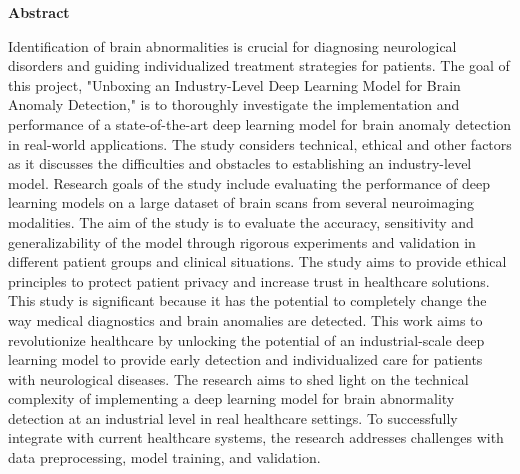 \begin{center}
    \huge \textbf{Abstract}
\end{center}
\vspace{15mm}
    Identification of brain abnormalities is crucial for diagnosing neurological disorders and guiding individualized treatment strategies for patients. The goal of this project, "Unboxing an Industry-Level Deep Learning Model for Brain Anomaly Detection," is to thoroughly investigate the implementation and performance of a state-of-the-art deep learning model for brain anomaly detection in real-world applications. The study considers technical, ethical and other factors as it discusses the difficulties and obstacles to establishing an industry-level model. Research goals of the study include evaluating the performance of deep learning models on a large dataset of brain scans from several neuroimaging modalities. The aim of the study is to evaluate the accuracy, sensitivity and generalizability of the model through rigorous experiments and validation in different patient groups and clinical situations. The study aims to provide ethical principles to protect patient privacy and increase trust in healthcare solutions. This study is significant because it has the potential to completely change the way medical diagnostics and brain anomalies are detected. This work aims to revolutionize healthcare by unlocking the potential of an industrial-scale deep learning model to provide early detection and individualized care for patients with neurological diseases. The research aims to shed light on the technical complexity of implementing a deep learning model for brain abnormality detection at an industrial level in real healthcare settings. To successfully integrate with current healthcare systems, the research addresses challenges with data preprocessing, model training, and validation.